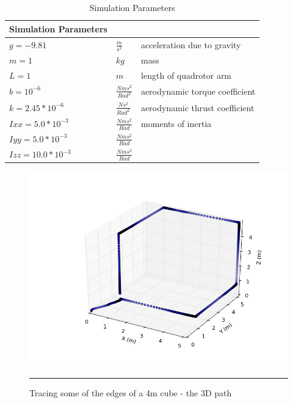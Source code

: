 \begin{table}\label{table:params}
\begin{doublespace}
\centering
\begin{tabular}{l l l}
    Simulation Parameters\\
    \hline
    $g = -9.81            $& $ \frac{m}{s^2}          $ & acceleration due to gravity\\
    $m = 1                $& $ kg                      $ & mass\\
    $L = 1                $& $ m                       $ & length of quadrotor arm\\
    $b = 10^{-6}          $& $ \frac{N m s^2}{Rad^2}  $ & aerodynamic torque coefficient\\
    $k = 2.45*10^{-6}     $& $ \frac{N s^2}{Rad^2}    $ & aerodynamic thrust coefficient\\
    $Ixx = 5.0*10^{-3}    $& $ \frac{N m s^2}{Rad}    $ & moments of inertia \\
    $Iyy = 5.0*10^{-3}    $& $ \frac{N m s^2}{Rad}    $ & \\
    $Izz = 10.0*10^{-3}   $& $ \frac{N m s^2}{Rad}    $ & \\
    \hline
\end{tabular}
\caption[Simulation Parameters]{Simulation Parameters}
\end{doublespace}
\end{table}

\begin{figure}[htbp]
	\centering
		\includegraphics[width=\textwidth]{Figures/CubeEdges3D.png}
		\rule{35em}{0.5pt}
	\caption[Cube Edges 3D]{Tracing some of the edges of a 4m cube - the 3D path}
	\label{fig:Cube Edges 3D}
\end{figure}

